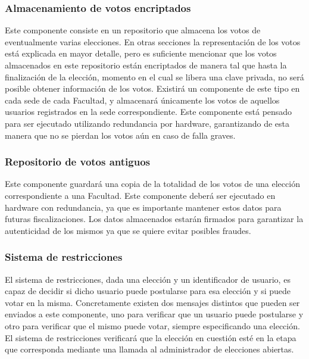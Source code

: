 \subsubsection{Almacenamiento de votos encriptados}
Este componente consiste en un repositorio que almacena los votos de eventualmente varias elecciones. En otras secciones la representación de los votos está explicada en mayor detalle, pero es suficiente mencionar que los votos almacenados en este repositorio están encriptados de manera tal que hasta la finalización de la elección, momento en el cual se libera una clave privada, no será posible obtener información de los votos.
Existirá un componente de este tipo en cada sede de cada Facultad, y almacenará únicamente los votos de aquellos usuarios registrados en la sede correspondiente. Este componente está pensado para ser ejecutado utilizando redundancia por hardware, garantizando de esta manera que no se pierdan los votos aún en caso de falla graves. 



\subsubsection{Repositorio de votos antiguos}
Este componente guardará una copia de la totalidad de los votos de una elección correspondiente a una Facultad. Este componente deberá ser ejecutado en hardware con redundancia, ya que es importante mantener estos datos para futuras fiscalizaciones. Los datos almacenados estarán firmados para garantizar la autenticidad de los mismos ya que se quiere evitar posibles fraudes. 





\subsubsection{Sistema de restricciones}


El sistema de restricciones, dada una elección y un identificador de usuario, es capaz de decidir si dicho usuario puede postularse para esa elección y si puede votar en la misma. Concretamente existen dos mensajes distintos que pueden ser enviados a este componente, uno para verificar que un usuario puede postularse y otro para verificar que el mismo puede votar, siempre especificando una elección.
El sistema de restricciones verificará que la elección en cuestión esté en la etapa que corresponda mediante una llamada al administrador de elecciones abiertas.


